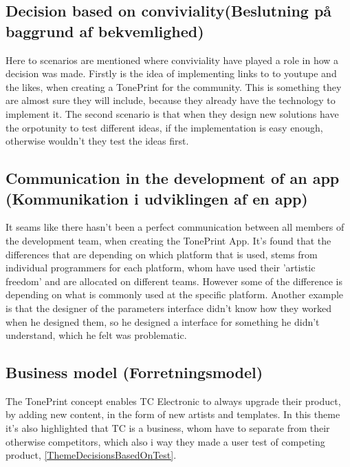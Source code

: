 \subsection*{Decision based on conviviality(Beslutning på baggrund af bekvemlighed)}
\label{DescisionBasedOnConviviality}
Here to scenarios are mentioned where conviviality have played a role in how a decision was made. Firstly is the idea of implementing links to to youtupe and the likes, when creating a TonePrint for the community. This is something they are almost sure they will include, because they already have the technology to implement it. The second scenario is that when they design new solutions have the orpotunity to test different ideas, if the implementation is easy enough, otherwise wouldn't they test the ideas first.

\subsection*{Communication in the development of an app (Kommunikation i udviklingen af en app)}
\label{ThemeCommunicationInTheDevelopmentOfAnApp}
It seams like there hasn't been a perfect communication between all members of the development team, when creating the TonePrint App. It's found that the differences that are depending on which platform that is used, stems from individual programmers for each platform, whom have used their 'artistic freedom' and are allocated on different teams. However some of the difference is depending on what is commonly used at the specific platform. Another example is that the designer of the parameters interface didn't know how they worked when he designed them, so he designed a interface for something he didn't understand, which he felt was problematic.

\subsection*{Business model (Forretningsmodel)}
\label{ThemeBusinessModel}
The TonePrint concept enables TC Electronic to always upgrade their product, by adding new content, in the form of new artists and templates. In this theme it's also highlighted that TC is a business, whom have to separate from their otherwise competitors, which also i way they made a user test of competing product, \autoref{ThemeDecisionsBasedOnTest}.


